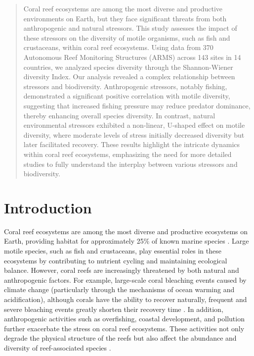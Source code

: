 \documentclass[a4paper, 11]{article}
\begin{document}
\begin{abstract}
Coral reef ecosystems are among the most diverse and productive environments on Earth, but they face significant threats from both anthropogenic and natural stressors. This study assesses the impact of these stressors on the diversity of motile organisms, such as fish and crustaceans, within coral reef ecosystems. Using data from 370 Autonomous Reef Monitoring Structures (ARMS) across 143 sites in 14 countries, we analyzed species diversity through the Shannon-Wiener diversity Index. Our analysis revealed a complex relationship between stressors and biodiversity. Anthropogenic stressors, notably fishing, demonstrated a significant positive correlation with motile diversity, suggesting that increased fishing pressure may reduce predator dominance, thereby enhancing overall species diversity. In contrast, natural environmental stressors exhibited a non-linear, U-shaped effect on motile diversity, where moderate levels of stress initially decreased diversity but later facilitated recovery. These results highlight the intricate dynamics within coral reef ecosystems, emphasizing the need for more detailed studies to fully understand the interplay between various stressors and biodiversity.
\end{abstract}

\section{Introduction}

Coral reef ecosystems are among the most diverse and productive ecosystems on Earth, providing habitat for approximately 25\% of known marine species \citep{hoegh2017coral}. Large motile species, such as fish and crustaceans, play essential roles in these ecosystems by contributing to nutrient cycling and maintaining ecological balance. However, coral reefs are increasingly threatened by both natural and anthropogenic factors. For example, large-scale coral bleaching events caused by climate change (particularly through the mechanisms of ocean warming and acidification), although corals have the ability to recover naturally, frequent and severe bleaching events greatly shorten their recovery time \citep{knowlton2001future, bostrom2020coral}. In addition, anthropogenic activities such as overfishing, coastal development, and pollution further exacerbate the stress on coral reef ecosystems. These activities not only degrade the physical structure of the reefs but also affect the abundance and diversity of reef-associated species \citep{hoegh2017coral}.
\end{document}

